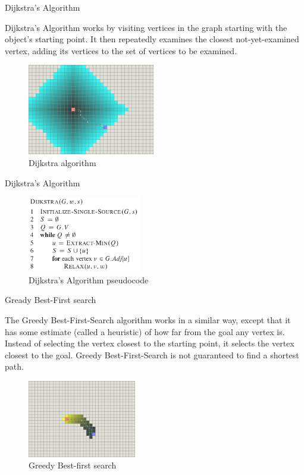 \documentclass[ignorenonframetext,]{beamer}
\begin{document}
\begin{frame}{Dijkstra's Algorithm}
\protect\hypertarget{dijkstras-algorithm}{}

Dijkstra's Algorithm works by visiting vertices in the graph starting
with the object's starting point. It then repeatedly examines the
closest not-yet-examined vertex, adding its vertices to the set of
vertices to be examined.

\begin{figure}
\centering
\includegraphics[width=\textwidth,height=1.5625in]{dijkstra.png}
\caption{Dijkstra algorithm}
\end{figure}

\end{frame}

\begin{frame}{Dijkstra's Algorithm}
\protect\hypertarget{dijkstras-algorithm-1}{}

\begin{figure}
\centering
\includegraphics[width=\textwidth,height=1.30208in]{dijkstra-pseudocode.png}
\caption{Dijkstra's Algorithm pseudocode}
\end{figure}

\end{frame}

\begin{frame}{Gready Best-First search}
\protect\hypertarget{gready-best-first-search}{}

The Greedy Best-First-Search algorithm works in a similar way, except
that it has some estimate (called a heuristic) of how far from the goal
any vertex is. Instead of selecting the vertex closest to the starting
point, it selects the vertex closest to the goal. Greedy
Best-First-Search is not guaranteed to find a shortest path.

\begin{figure}
\centering
\includegraphics[width=\textwidth,height=1.33333in]{best-first-search.png}
\caption{Greedy Best-first search}
\end{figure}

\end{frame}
\end{document}
